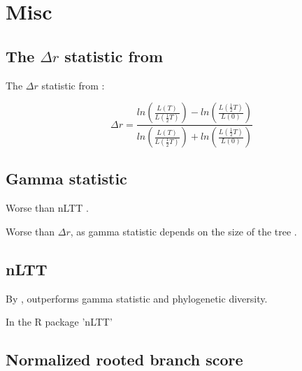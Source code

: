 \section{Misc}


\subsection{The $\Delta r$ statistic from \cite{pigot2010shape}}

The $\Delta r$ statistic from \cite{pigot2010shape}:

\begin{equation}
  \Delta r=\frac{ln\left(\frac{L(T)}{L(\frac{1}{2}T)}\right)-ln\left(\frac{L(\frac{1}{2}T)}{L(0)}\right)}{ln\left(\frac{L(T)}{L(\frac{1}{2}T)}\right)+ln\left(\frac{L(\frac{1}{2}T)}{L(0)}\right)}
  \label{eq:delta_r}
\end{equation}

\subsection{Gamma statistic}

Worse than nLTT \cite{janzen2015approximate}.

Worse than $\Delta r$, as gamma statistic depends on the size of the tree \cite{etienne2012prolonging}.

\subsection{nLTT}

By \cite{janzen2015approximate}, outperforms gamma statistic and phylogenetic diversity.

In the R package 'nLTT'

\subsection{Normalized rooted branch score}

